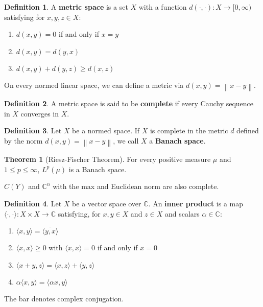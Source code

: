 \documentclass{article}
\theoremstyle{definition}
\newtheorem{theorem}{Theorem}
\newtheorem*{defn}{Definition}
\newcommand{\norm}[1]{\left\lVert#1\right\rVert}
\begin{document}
    \begin{defn}
        A \textbf{metric space} is a set $X$ with a function $d(\cdot,\cdot):X\to[0,\infty)$ satisfying for $x,y,z\in X$:
        \begin{enumerate}
            \item $d(x,y) = 0$ if and only if $x=y$
            \item $d(x,y) = d(y,x)$
            \item $d(x,y)+d(y,z)\geq d(x,z)$
        \end{enumerate}
        On every normed linear space, we can define a metric via $d(x,y) = \norm{x-y}$.
    \end{defn}

    \begin{defn}
        A metric space is said to be \textbf{complete} if every Cauchy sequence in $X$ converges in $X$.
    \end{defn}

    \begin{defn}
        Let $X$ be a normed space. If $X$ is complete in the metric $d$ defined by the norm $d(x,y)=\norm{x-y}$, we call $X$
        a \textbf{Banach space}.
    \end{defn}

    \begin{theorem}[Riesz-Fischer Theorem]
        For every positive measure $\mu$ and $1\leq p\leq \infty$, $L^p(\mu)$ is a Banach space.
    \end{theorem}

    $C(Y)$ and $\mathbb{C}^n$ with the max and Euclidean norm are also complete.

    \begin{defn}
        Let $X$ be a vector space over $\mathbb{C}$. An \textbf{inner product} is a map 
        $\langle\cdot,\cdot\rangle:X\times X\to\mathbb{C}$ satisfying, for $x,y\in X$ and $z\in X$ and scalars $\alpha\in\mathbb{C}$:
        \begin{enumerate}
            \item $\langle x,y\rangle = \overline{\langle y,x\rangle}$
            \item $\langle x,x\rangle \geq 0$ with $\langle x,x\rangle = 0$ if and only if $x=0$
            \item $\langle x+y,z\rangle = \langle x,z\rangle + \langle y,z\rangle$
            \item $\alpha\langle x,y\rangle = \langle \alpha x,y\rangle$
        \end{enumerate}
        The bar denotes complex conjugation.
    \end{defn}
\end{document}

